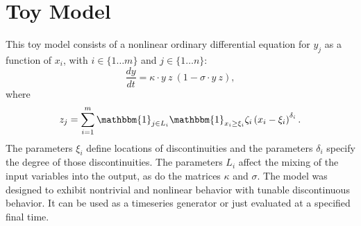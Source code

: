 \documentclass[12pt]{article}
\begin{document}
\printbibliography


\appendix


\section{Toy Model}
\label{sec:toy}

This toy model consists of a nonlinear ordinary differential equation for $y_j$ as a function of $x_i$, with $i \in \{ 1 \ldots m \}$ and $j \in \{ 1 \ldots n \}$:
\begin{equation*}
    \frac{dy}{dt} = \kappa \cdot y \ z \ \left( 1 - \sigma \cdot y \  z \right) ,
\end{equation*}
where
\begin{equation*}
    z_j = \sum_{i=1}^m \mathbbm{1}_{j \in L_i} \mathbbm{1}_{x_i \ge \xi_i} \zeta_i \left( x_i - \xi_i \right)^{\delta_i} .
\end{equation*}
The parameters $\xi_i$ define locations of discontinuities and the parameters $\delta_i$ specify the degree of those discontinuities. The parameters $L_i$ affect the mixing of the input variables into the output, as do the matrices $\kappa$ and $\sigma$. The model was designed to exhibit nontrivial and nonlinear behavior with tunable discontinuous behavior. It can be used as a timeseries generator or just evaluated at a specified final time.
\end{document}
